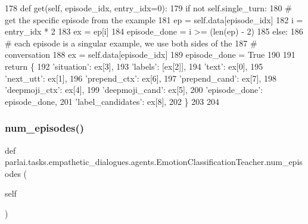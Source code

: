 \begin{DoxyCode}
178     \textcolor{keyword}{def }get(self, episode\_idx, entry\_idx=0):
179         \textcolor{keywordflow}{if} \textcolor{keywordflow}{not} self.single\_turn:
180             \textcolor{comment}{# get the specific episode from the example}
181             ep = self.data[episode\_idx]
182             i = entry\_idx * 2
183             ex = ep[i]
184             episode\_done = i >= (len(ep) - 2)
185         \textcolor{keywordflow}{else}:
186             \textcolor{comment}{# each episode is a singular example, we use both sides of the}
187             \textcolor{comment}{# conversation}
188             ex = self.data[episode\_idx]
189             episode\_done = \textcolor{keyword}{True}
190 
191         \textcolor{keywordflow}{return} \{
192             \textcolor{stringliteral}{'situation'}: ex[3],
193             \textcolor{stringliteral}{'labels'}: [ex[2]],
194             \textcolor{stringliteral}{'text'}: ex[0],
195             \textcolor{stringliteral}{'next\_utt'}: ex[1],
196             \textcolor{stringliteral}{'prepend\_ctx'}: ex[6],
197             \textcolor{stringliteral}{'prepend\_cand'}: ex[7],
198             \textcolor{stringliteral}{'deepmoji\_ctx'}: ex[4],
199             \textcolor{stringliteral}{'deepmoji\_cand'}: ex[5],
200             \textcolor{stringliteral}{'episode\_done'}: episode\_done,
201             \textcolor{stringliteral}{'label\_candidates'}: ex[8],
202         \}
203 
204 
\end{DoxyCode}
\mbox{\label{classparlai_1_1tasks_1_1empathetic__dialogues_1_1agents_1_1EmotionClassificationTeacher_acad8b18280f22798f1b0b6586e55765c}} 
\subsubsection{\texorpdfstring{num\+\_\+episodes()}{num\_episodes()}}
{\footnotesize\ttfamily def parlai.\+tasks.\+empathetic\+\_\+dialogues.\+agents.\+Emotion\+Classification\+Teacher.\+num\+\_\+episodes (\begin{DoxyParamCaption}\item[{}]{self }\end{DoxyParamCaption})}



